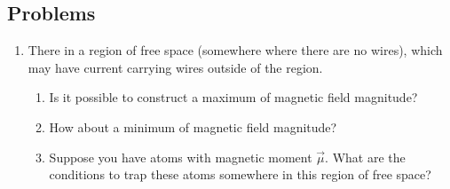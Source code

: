 \documentclass[12pt]{book}
\begin{document}
\subsection{Problems}
\begin{enumerate}
\item There in a region of free space (somewhere where there are no wires), which may have current carrying wires outside of the region.
\begin{enumerate}
\item Is it possible to construct a maximum of magnetic field magnitude?
\item How about a minimum of magnetic field magnitude?
\item Suppose you have atoms with magnetic moment $\vec{\mu}.$ What are the conditions to trap these atoms somewhere in this region of free space?
\end{enumerate}


\end{enumerate}
\end{document}
